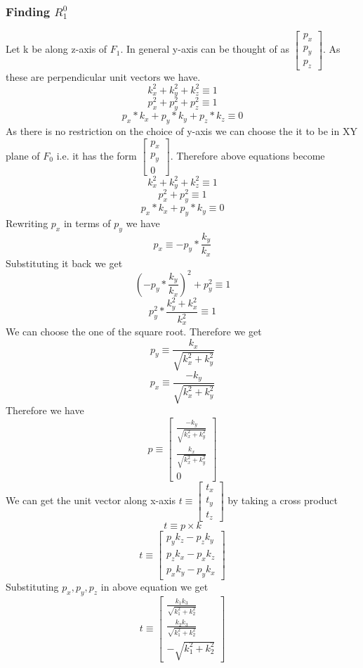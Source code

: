 \documentclass[12pt]{article}
\begin{document}
\subsubsection*{Finding $R_1^0$}
Let k be along z-axis of $ F_1 $. In general y-axis can be thought of as $ \begin{bmatrix} p_x \\ p_y \\ p_z \end{bmatrix} $.
As these are perpendicular unit vectors we have.
\[
  k_x^2 + k_y^2 + k_z^2 \equiv 1
\]
\[
  p_x^2 + p_y^2 + p_z^2 \equiv 1
\]
\[
  p_x * k_x + p_y * k_y + p_z * k_z \equiv 0
\]
As there is no restriction on the choice of y-axis we can choose the it to be in XY plane of $ F_0 $ i.e. it has the form $ \begin{bmatrix} p_x \\ p_y \\ 0 \end{bmatrix} $.
Therefore above equations become
\[
  k_x^2 + k_y^2 + k_z^2 \equiv 1
\]
\[
  p_x^2 + p_y^2 \equiv 1
\]
\[
  p_x * k_x + p_y * k_y \equiv 0
\]
Rewriting $ p_x $ in terms of $ p_y $ we have
\[
  p_x \equiv -p_y * \frac{k_y}{k_x}
\]
Substituting it back we get
\[
  (-p_y * \frac{k_y}{k_x})^2 + p_y^2 \equiv 1
\]
\[
  p_y^2 * \frac{k_y^2 + k_x^2}{k_x^2} \equiv 1
\]
We can choose the one of the square root. Therefore we get
\[
  p_y \equiv \frac{k_x}{\sqrt{k_x^2 + k_y^2}}
\]
\[
  p_x \equiv \frac{-k_y}{\sqrt{k_x^2 + k_y^2}}
\]
Therefore we have
\[
  p \equiv
  \begin{bmatrix}
  \frac{-k_y}{\sqrt{k_x^2 + k_y^2}} \\
  \frac{k_x}{\sqrt{k_x^2 + k_y^2}}  \\
  0
  \end{bmatrix}
\]
We can get the unit vector along x-axis $ t \equiv \begin{bmatrix} t_x \\ t_y \\ t_z \end{bmatrix} $ by taking a cross product
\[
  t \equiv p \times k
\]
\[
  t \equiv \begin{bmatrix} p_y k_z - p_z k_y \\ p_z k_x - p_x k_z \\ p_x k_y - p_y k_x \end{bmatrix}
\]
Substituting $ p_x, p_y, p_z $ in above equation we get
\[
  t \equiv
  \begin{bmatrix}
    \frac{k_1k_3}{\sqrt{k_1^2 + k_2^2}} \\
    \frac{k_2k_3}{\sqrt{k_1^2 + k_2^2}} \\
    -\sqrt{k_1^2 + k_2^2}
  \end{bmatrix}
\]
\end{document}
